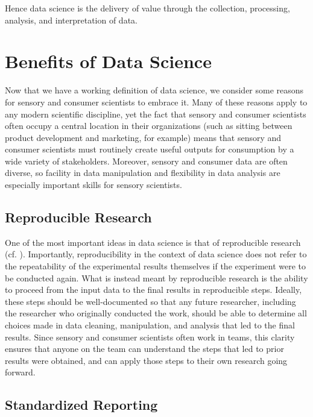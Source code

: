 \documentclass[
]{book}
\begin{document}
Hence data science is the delivery of value through the collection, processing, analysis, and interpretation of data.

\hypertarget{benefits-of-data-science}{%
\section{Benefits of Data Science}\label{benefits-of-data-science}}

Now that we have a working definition of data science, we consider some reasons for sensory and consumer scientists to embrace it. Many of these reasons apply to any modern scientific discipline, yet the fact that sensory and consumer scientists often occupy a central location in their organizations (such as sitting between product development and marketing, for example) means that sensory and consumer scientists must routinely create useful outputs for consumption by a wide variety of stakeholders. Moreover, sensory and consumer data are often diverse, so facility in data manipulation and flexibility in data analysis are especially important skills for sensory scientists.

\hypertarget{reproducible-research}{%
\subsection{Reproducible Research}\label{reproducible-research}}

One of the most important ideas in data science is that of reproducible research (cf. \citet{Peng2011}). Importantly, reproducibility in the context of data science does not refer to the repeatability of the experimental results themselves if the experiment were to be conducted again. What is instead meant by reproducible research is the ability to proceed from the input data to the final results in reproducible steps. Ideally, these steps should be well-documented so that any future researcher, including the researcher who originally conducted the work, should be able to determine all choices made in data cleaning, manipulation, and analysis that led to the final results. Since sensory and consumer scientists often work in teams, this clarity ensures that anyone on the team can understand the steps that led to prior results were obtained, and can apply those steps to their own research going forward.

\hypertarget{standardized-reporting}{%
\subsection{Standardized Reporting}\label{standardized-reporting}}
\end{document}
